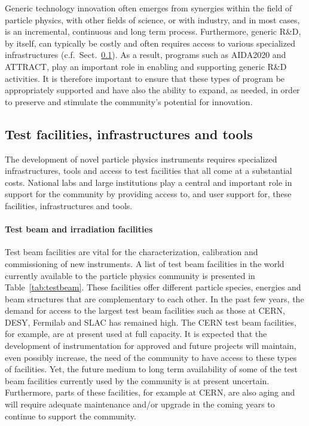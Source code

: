 Generic technology innovation often emerges from synergies within the field of particle physics, with other fields of science, or with industry, and in most cases, is an incremental, continuous and long term process.  Furthermore, generic R\&D, by itself, can typically be costly and often requires access to various specialized infrastructures (c.f.\ Sect.~\ref{sec:detector:infrastructure}).  As a result, programs such as AIDA2020 and ATTRACT, play an important role in enabling and supporting generic R\&D activities. %
It is therefore important to ensure that these types of program be appropriately supported and have also the ability to expand, as needed, in order to preserve and stimulate the community's potential for innovation. 



\subsection{Test facilities, infrastructures and tools}
\label{sec:detector:infrastructure}


The development of novel particle physics
instruments requires specialized infrastructures, tools and access to test
facilities that all come at a substantial
costs.  National labs and large institutions play a central and 
important role in support for the community
by providing access to, and user support for, these facilities, infrastructures and tools.  

\paragraph*{Test beam and irradiation facilities}
Test beam facilities are vital for the characterization, calibration and commissioning of new instruments.  A list of test beam facilities in the world currently available to the particle physics community is presented in Table~\ref{tab:testbeam}.  These facilities offer different particle species, energies and beam structures that are complementary to each other.   In the past few years, the demand for access to the largest test beam facilities such as those at CERN, DESY, Fermilab and SLAC has remained high.  The CERN test beam facilities, for example, are at present used at full capacity.  It is expected that the development of instrumentation for approved and future projects will maintain, even possibly increase, the need of the community to have access to these types of facilities.  Yet, the future medium to long term availability of some of the test beam facilities currently used by the community is at present uncertain.  Furthermore, parts of these facilities, for example at CERN, are also aging and will require adequate maintenance and/or upgrade in the coming years to continue to support the community.  


